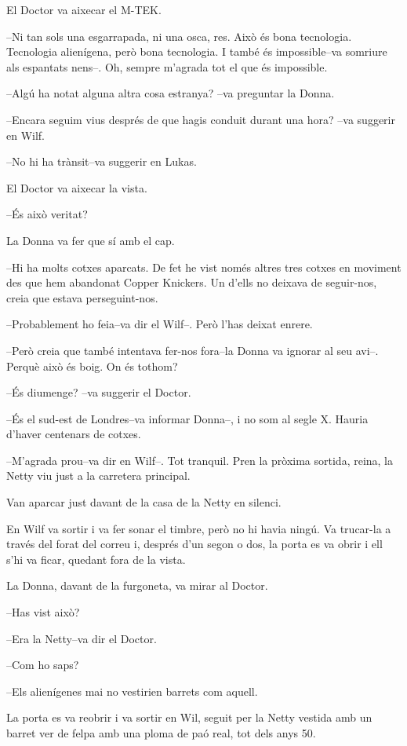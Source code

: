 El Doctor va aixecar el M-TEK.

--Ni tan sols una esgarrapada, ni una osca, res. Això és bona
tecnologia. Tecnologia alienígena, però bona tecnologia. I també és
impossible--va somriure als espantats nens--. Oh, sempre m'agrada tot el
que és impossible.

--Algú ha notat alguna altra cosa estranya? --va preguntar la Donna.

--Encara seguim vius després de que hagis conduit durant una hora? --va
suggerir en Wilf.

--No hi ha trànsit--va suggerir en Lukas.

El Doctor va aixecar la vista.

--És això veritat?

La Donna va fer que sí amb el cap.

--Hi ha molts cotxes aparcats. De fet he vist només altres tres cotxes
en moviment des que hem abandonat Copper Knickers. Un d'ells no deixava
de seguir-nos, creia que estava perseguint-nos.

--Probablement ho feia--va dir el Wilf--. Però l'has deixat enrere.

--Però creia que també intentava fer-nos fora--la Donna va ignorar al
seu avi--. Perquè això és boig. On és tothom?

--És diumenge? --va suggerir el Doctor.

--És el sud-est de Londres--va informar Donna--, i no som al segle X.
Hauria d'haver centenars de cotxes.

--M'agrada prou--va dir en Wilf--. Tot tranquil. Pren la pròxima
sortida, reina, la Netty viu just a la carretera principal.

Van aparcar just davant de la casa de la Netty en silenci.

En Wilf va sortir i va fer sonar el timbre, però no hi havia ningú. Va
trucar-la a través del forat del correu i, després d'un segon o dos, la
porta es va obrir i ell s'hi va ficar, quedant fora de la vista.

La Donna, davant de la furgoneta, va mirar al Doctor.

--Has vist això?

--Era la Netty--va dir el Doctor.

--Com ho saps?

--Els alienígenes mai no vestirien barrets com aquell.

La porta es va reobrir i va sortir en Wil, seguit per la Netty vestida
amb un barret ver de felpa amb una ploma de paó real, tot dels anys 50.

